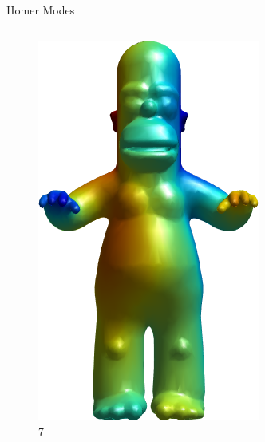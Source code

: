 \documentclass{beamer}
\begin{document}
\begin{frame}{Homer Modes}
\begin{columns}
\begin{column}[T]{3cm}
\begin{figure}[t]
    \includegraphics[width=\textwidth]{Harmonics/HomerModes/7.png}
    \caption*{\huge 7}
\end{figure}
\end{column}
\begin{column}[T]{3cm}
\begin{figure}[t]


\end{figure}
\end{column}
\end{columns}
\end{frame}
\end{document}
